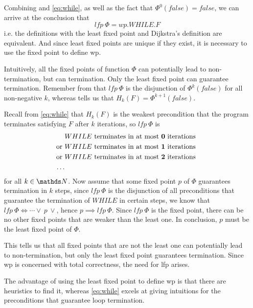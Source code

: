 Combining  and \autoref{eq:while}, as well as the fact that $\Phi^0(false)=false$, we can arrive at the conclusion that 
$$lfp\ \Phi = wp.WHILE.F$$
i.e. the definitions with the least fixed point and Dijkstra's definition are equivalent.
And since least fixed points are unique if they exist, it is necessary to use the  fixed point to define wp. 

Intuitively, all the fixed points of function $\Phi$ can potentially lead to non-termination, but can  termination. 
Only the least fixed point can guarantee termination. 
Remember from  that $lfp \ \Phi$ is the disjunction of $\Phi^{k}(false)$ for all non-negative $k$, whereas  tells us that $H_k(F)=\Phi^{k+1}(false)$.

Recall from \autoref{eq:while} that $H_k(F)$ is the weakest precondition that the program terminates satisfying $F$ after  $k$ iterations, so $lfp\ \Phi$ is 
\begin{align*}
  & WHILE \text{ terminates in at most \textbf{0} iterations }\\
  \text{or } & WHILE \text{ terminates in at most \textbf{1} iterations} \\
  \text{or } & WHILE \text{ terminates in at most \textbf{2} iterations} \\
  \dots
\end{align*}
for all $k\in\N$. 
Now assume that some fixed point $p$ of $\Phi$ guarantees termination in $k$ steps, since $lfp\ \Phi$ is the disjunction of all preconditions that guarantee the termination of $WHILE$ in certain steps, we know that $lfp\ \Phi \Leftrightarrow \cdots\vee\ p\ \vee$, hence $p\implies lfp\ \Phi$. 
Since $lfp \ \Phi$ is the  fixed point, there can be no other fixed points that are weaker than the least one. 
In conclusion, $p$ must be the least fixed point of $\Phi$. 

This tells us that all fixed points that are not the least one can potentially lead to non-termination, but only the least fixed point guarantees termination. 
Since wp is concerned with total correctness, the need for lfp arises. 

The advantage of using the least fixed point to define wp is that there are heuristics to find it, whereas \autoref{eq:while} excels at giving intuitions for the preconditions that guarantee loop termination. 

